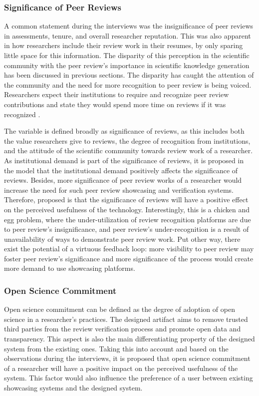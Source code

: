 \subsubsection{Significance of Peer Reviews}

A common statement during the interviews was the insignificance of peer reviews in assessments, tenure, and overall researcher reputation. This was also apparent in how researchers include their review work in their resumes, by only sparing little space for this information. The disparity of this perception in the scientific community with the peer review's importance in scientific knowledge generation has been discussed in previous sections. The disparity has caught the attention of the community \parencite{Verissimo.2013, Tennant.2020} and the need for more recognition to peer review is being voiced. Researchers expect their institutions to require and recognize peer review contributions \parencite{Publons.2018} and state they would spend more time on reviews if it was recognized \parencite{Warne.2016}.

The variable is defined broadly as significance of reviews, as this includes both the value researchers give to reviews, the degree of recognition from institutions, and the attitude of the scientific community towards review work of a researcher. As institutional demand is part of the significance of reviews, it is proposed in the model that the institutional demand positively affects the significance of reviews. Besides, more significance of peer review works of a researcher would increase the need for such peer review showcasing and verification systems. Therefore, proposed is that the significance of reviews will have a positive effect on the perceived usefulness of the technology. Interestingly, this is a chicken and egg problem, where the under-utilization of review recognition platforms are due to peer review's insignificance, and peer review's under-recognition is a result of unavailability of ways to demonstrate peer review work. Put other way, there exist the potential of a virtuous feedback loop: more visibility to peer review may foster peer review's significance and more significance of the process would create more demand to use showcasing platforms.

\subsubsection{Open Science Commitment}

Open science commitment can be defined as the degree of adoption of open science in a researcher's practices. The designed artifact aims to remove trusted third parties from the review verification process and promote open data and transparency. This aspect is also the main differentiating property of the designed system from the existing ones. Taking this into account and based on the observations during the interviews, it is proposed that open science commitment of a researcher will have a positive impact on the perceived usefulness of the system. This factor would also influence the preference of a user between existing showcasing systems and the designed system. 

